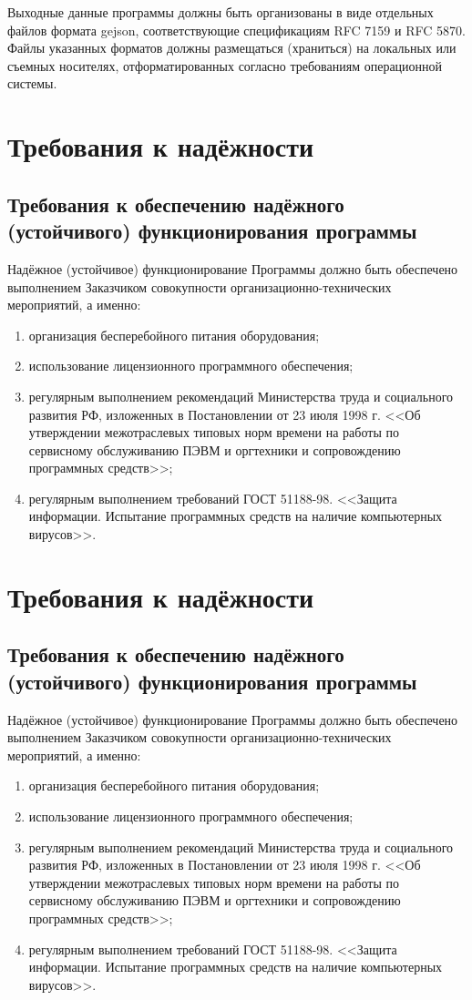 Выходные данные программы должны быть организованы в виде отдельных файлов формата gejson, соответствующие 
спецификациям RFC 7159 и RFC 5870. Файлы указанных форматов должны размещаться (храниться) на локальных или 
съемных носителях, отформатированных согласно требованиям операционной системы.

\section{Требования к надёжности}
\subsection{Требования к обеспечению надёжного (устойчивого) функционирования программы}
Надёжное (устойчивое) функционирование Программы должно быть обеспечено выполнением Заказчиком совокупности 
организационно-технических мероприятий, а именно:
\begin{enumerate}
    \item организация бесперебойного питания оборудования;
    \item использование лицензионного программного обеспечения;
    \item регулярным выполнением рекомендаций Министерства труда и социального развития РФ, изложенных в 
        Постановлении от 23 июля 1998 г. <<Об утверждении межотраслевых типовых норм времени на работы по
        сервисному обслуживанию ПЭВМ и оргтехники и сопровождению программных средств>>;
    \item регулярным выполнением требований ГОСТ 51188-98. <<Защита информации. Испытание программных средств 
        на наличие компьютерных вирусов>>.
\end{enumerate}

\section{Требования к надёжности}
\subsection{Требования к обеспечению надёжного (устойчивого) функционирования программы}
Надёжное (устойчивое) функционирование Программы должно быть обеспечено выполнением Заказчиком совокупности 
организационно-технических мероприятий, а именно:
\begin{enumerate}
    \item организация бесперебойного питания оборудования;
    \item использование лицензионного программного обеспечения;
    \item регулярным выполнением рекомендаций Министерства труда и социального развития РФ, изложенных в 
        Постановлении от 23 июля 1998 г. <<Об утверждении межотраслевых типовых норм времени на работы по
        сервисному обслуживанию ПЭВМ и оргтехники и сопровождению программных средств>>;
    \item регулярным выполнением требований ГОСТ 51188-98. <<Защита информации. Испытание программных средств 
        на наличие компьютерных вирусов>>.
\end{enumerate}

